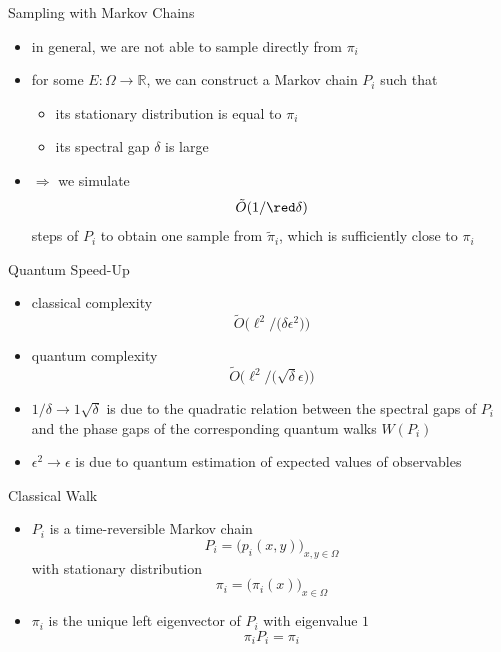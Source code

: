 \documentclass[slideColor]{prosper}
\renewcommand{\>}{\rangle}
\newcommand{\<}{\langle}
\begin{document}
\begin{slide}{Sampling with Markov Chains}
\begin{itemize}
\item in general, we are not able to sample directly from $\pi_i$ 

\medskip
\item for some $E : \Omega \rightarrow \mathbb{R}$, we can construct a Markov chain $P_i$ such that 

\begin{itemize}
\medskip
\item its stationary distribution is equal to $\pi_i$ 

\medskip
\item its spectral gap $\delta$ is large
\end{itemize}

\medskip
\item $\Rightarrow$ we simulate  
\[
\tilde{O}(1/ {\red \delta})
\] 
steps of $P_i$ to obtain one sample from $\tilde{\pi}_i$, which is sufficiently close to $\pi_i$
\end{itemize}
\end{slide}


\begin{slide}{Quantum Speed-Up}
\begin{itemize}
\item classical complexity
\[
\tilde{O}\Big(
\ell^2 /\big(\delta \epsilon^2\big) 
\Big)
\]

\item quantum complexity
\[
\tilde{O}\Big(
\ell^2/\big(\sqrt{\delta} \epsilon\big)
\Big)
\]

\item $1/\delta \rightarrow 1\sqrt{\delta}$ is due to the quadratic relation between the spectral gaps of $P_i$ and the phase gaps of the corresponding quantum walks $W(P_i)$ 

\medskip
\item $\epsilon^2 \rightarrow \epsilon$ is due to quantum estimation of expected values of observables
\end{itemize}
\end{slide}


\begin{slide}{Classical Walk}
\begin{itemize}
\item $P_i$ is a time-reversible Markov chain 
\[
P_i=\Big(p_i(x,y)\Big)_{x,y\in\Omega}
\]
with stationary distribution 
\[
\pi_i=\Big(\pi_i(x)\Big)_{x\in\Omega}
\]

\item $\pi_i$ is the unique left eigenvector of $P_i$ with eigenvalue $1$
\[
\pi_i P_i = \pi_i
\]

\end{itemize}
\end{slide}
\end{document}
